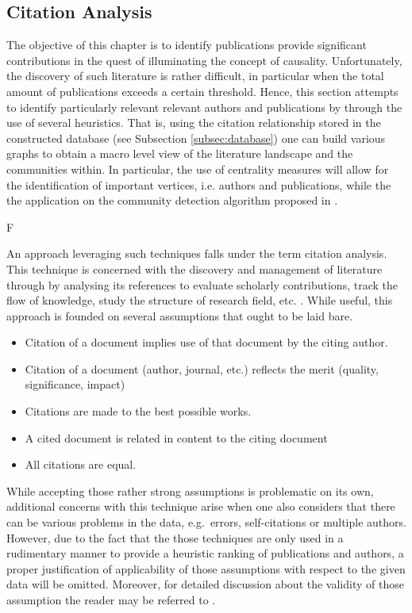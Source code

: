 \documentclass[11pt,a4paper]{book}
\theoremstyle{definition}
\theoremstyle{definition}
\theoremstyle{definition}
\theoremstyle{remark}
\begin{document}
\subsection{Citation Analysis}

The objective of this chapter is to identify publications provide significant contributions in the quest of illuminating the concept of causality. Unfortunately, the discovery of such literature is rather difficult, in particular when the total amount of publications exceeds a certain threshold. Hence, this section attempts to identify particularly relevant relevant authors and publications by through the use of several heuristics.
That is, using the citation relationship stored in the constructed database (see Subsection \ref{subsec:database}) one can build various graphs to obtain a macro level view of the literature landscape and the communities within. In particular, the use of centrality measures will allow for the identification of important vertices, i.e. authors and publications, while the the application on the community detection algorithm 
proposed in 
 \parencite{meho2007rise,mingers2015review,leydesdorff2012scientometrics}.



F





An approach leveraging such techniques falls under the term citation analysis. This technique is concerned with the discovery and management of literature through by analysing its references to evaluate scholarly contributions, track the flow of knowledge, study the structure of research field, etc. \parencite[p.~1-5]{zhao2015analysis}. While useful, this approach is founded on several assumptions that ought to be laid bare.
\begin{itemize}
\item Citation of a document implies use of that document by the citing author.
\item Citation of a document (author, journal, etc.) reflects the merit (quality, significance, impact)
\item Citations are made to the best possible works.
\item A cited document is related in content to the citing document
\item All citations are equal.
\end{itemize}
While accepting those rather strong assumptions is problematic on its own, additional concerns with this technique arise when one also considers that there can be various problems in the data, e.g.\ errors, self-citations or multiple authors. However, due to the fact that the those techniques are only used in a rudimentary manner to provide a heuristic ranking of publications and authors, a proper justification of applicability of those assumptions with respect to the given data will be omitted. Moreover, for detailed discussion about the validity of those assumption the reader may be referred to \parencite{smith1981citation}.\\
\end{document}

